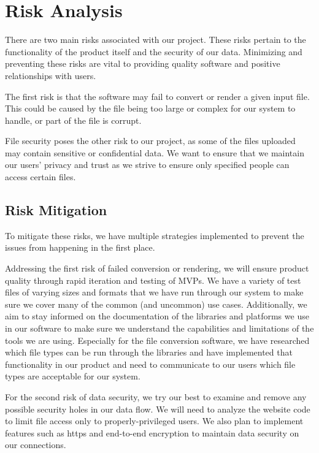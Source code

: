 \section{Risk Analysis}
There are two main risks associated with our project. These risks pertain to the functionality of the product itself and the security of our data.
Minimizing and preventing these risks are vital to providing quality software and positive relationships with users.

The first risk is that the software may fail to convert or render a given input file.
This could be caused by the file being too large or complex for our system to handle, or part of the file is corrupt. 

File security poses the other risk to our project, as some of the files uploaded may contain sensitive or confidential data.
We want to ensure that we maintain our users' privacy and trust as we strive to ensure only specified people can access certain files.
\subsection{Risk Mitigation}
To mitigate these risks, we have multiple strategies implemented to prevent the issues from happening in the first place.

Addressing the first risk of failed conversion or rendering, we will ensure product quality through rapid iteration and testing of MVPs. 
We have a variety of test files of varying sizes and formats that we have run through our system to make sure we cover many of the common (and uncommon) use cases.
Additionally, we aim to stay informed on the documentation of the libraries and platforms we use in our software to make sure we understand the capabilities and limitations of the tools we are using.
Especially for the file conversion software, we have researched which file types can be run through the libraries and have implemented that functionality in our product and need to communicate to our users which file types are acceptable for our system. 

For the second risk of data security, we try our best to examine and remove any possible security holes in our data flow.
We will need to analyze the website code to limit file access only to properly-privileged users. 
We also plan to implement features such as https and end-to-end encryption to maintain data security on our connections.